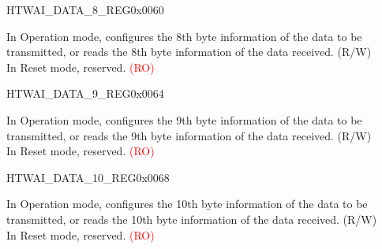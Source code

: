 \begin{register}{H}{TWAI\_DATA\_8\_REG}{0x0060}\label{regdesc:TWAIDATA8REG}
%
%
\regnewline%
\begin{regdesc}\begin{reglist}
\label{fielddesc:TWAIDATA8}\item [TWAI\_DATA\_8] In Operation mode, configures the 8th byte information of the data to be transmitted, or reads the 8th byte information of the data received. (R/W)\\
In Reset mode, reserved. \textcolor{red}{(RO)}
\end{reglist}\end{regdesc}
\end{register}


\begin{register}{H}{TWAI\_DATA\_9\_REG}{0x0064}\label{regdesc:TWAIDATA9REG}
%
%
\regnewline%
\begin{regdesc}\begin{reglist}
\label{fielddesc:TWAIDATA9}\item [TWAI\_DATA\_9] In Operation mode, configures the 9th byte information of the data to be transmitted, or reads the 9th byte information of the data received. (R/W)\\
In Reset mode, reserved. \textcolor{red}{(RO)}
\end{reglist}\end{regdesc}
\end{register}


\begin{register}{H}{TWAI\_DATA\_10\_REG}{0x0068}\label{regdesc:TWAIDATA10REG}
%
%
\regnewline%
\begin{regdesc}\begin{reglist}
\label{fielddesc:TWAIDATA10}\item [TWAI\_DATA\_10] In Operation mode, configures the 10th byte information of the data to be transmitted, or reads the 10th byte information of the data received. (R/W)\\
In Reset mode, reserved. \textcolor{red}{(RO)}
\end{reglist}\end{regdesc}
\end{register}


